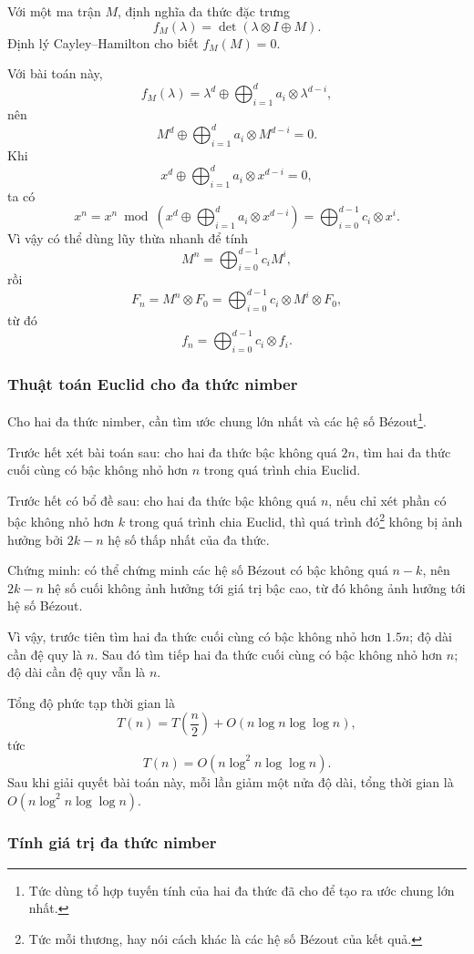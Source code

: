 \documentclass[11pt]{article}
\begin{document}
Với một ma trận \(M\), định nghĩa đa thức đặc trưng
\[
  f_M(\lambda)=\det(\lambda\otimes I\oplus M).
\]
Định lý Cayley--Hamilton cho biết \(f_M(M)=0\).

Với bài toán này,
\[
  f_M(\lambda)=\lambda^d\oplus\bigoplus_{i=1}^d a_i\otimes\lambda^{d-i},
\]
nên
\[
  M^d\oplus\bigoplus_{i=1}^d a_i\otimes M^{d-i}=0.
\]
Khi
\[
  x^d\oplus\bigoplus_{i=1}^d a_i\otimes x^{d-i}=0,
\]
ta có
\[
  x^n=x^n\bmod\left(x^d\oplus\bigoplus_{i=1}^d a_i\otimes x^{d-i}\right)
  =\bigoplus_{i=0}^{d-1} c_i\otimes x^i.
\]
Vì vậy có thể dùng lũy thừa nhanh để tính
\[
  M^n=\bigoplus_{i=0}^{d-1} c_i M^i,
\]
rồi
\[
  F_n=M^n\otimes F_0=\bigoplus_{i=0}^{d-1} c_i\otimes M^i\otimes F_0,
\]
từ đó
\[
  f_n=\bigoplus_{i=0}^{d-1} c_i\otimes f_i.
\]

\subsubsection{Thuật toán Euclid cho đa thức nimber}

Cho hai đa thức nimber, cần tìm ước chung lớn nhất và các hệ số
Bézout\footnote{Tức dùng tổ hợp tuyến tính của hai đa thức đã cho để tạo ra ước
chung lớn nhất.}.

Trước hết xét bài toán sau: cho hai đa thức bậc không quá \(2n\), tìm hai đa
thức cuối cùng có bậc không nhỏ hơn \(n\) trong quá trình chia Euclid.

Trước hết có bổ đề sau: cho hai đa thức bậc không quá \(n\), nếu chỉ xét phần có
bậc không nhỏ hơn \(k\) trong quá trình chia Euclid, thì quá trình đó\footnote{Tức
mỗi thương, hay nói cách khác là các hệ số Bézout của kết quả.} không bị ảnh
hưởng bởi \(2k-n\) hệ số thấp nhất của đa thức.

Chứng minh: có thể chứng minh các hệ số Bézout có bậc không quá \(n-k\), nên
\(2k-n\) hệ số cuối không ảnh hưởng tới giá trị bậc cao, từ đó không ảnh hưởng
tới hệ số Bézout.

Vì vậy, trước tiên tìm hai đa thức cuối cùng có bậc không nhỏ hơn \(1.5n\); độ
dài cần đệ quy là \(n\). Sau đó tìm tiếp hai đa thức cuối cùng có bậc không nhỏ
hơn \(n\); độ dài cần đệ quy vẫn là \(n\).

Tổng độ phức tạp thời gian là
\[
  T(n)=T\!\left(\frac n2\right)+O(n\log n\log\log n),
\]
tức
\[
  T(n)=O(n\log^2 n\log\log n).
\]
Sau khi giải quyết bài toán này, mỗi lần giảm một nửa độ dài, tổng thời gian là
\(O(n\log^2 n\log\log n)\).

\subsubsection{Tính giá trị đa thức nimber}
\end{document}
